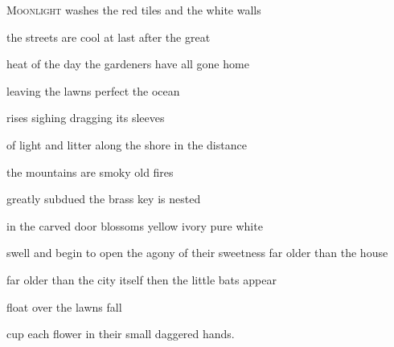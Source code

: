 
\begin{poem}
\begin{stanza}
\textsc{Moonlight} \verseline
washes the red tiles\verseline
and the white walls
\end{stanza}

\begin{stanza}
the streets\verseline
are cool at last\verseline
after the great
\end{stanza}

\begin{stanza}
heat of the day\verseline
the gardeners\verseline
have all gone home
\end{stanza}

\begin{stanza}
leaving the lawns\verseline
perfect\verseline
the ocean
\end{stanza}

\begin{stanza}
rises\verseline
sighing\verseline
dragging its sleeves
\end{stanza}

\begin{stanza}
of light and litter\verseline
along the shore\verseline
in the distance
\end{stanza}

\begin{stanza}
the mountains\verseline
are smoky\verseline
old fires
\end{stanza}

\begin{stanza}
greatly subdued\verseline
the brass key\verseline
is nested
\end{stanza}

\begin{stanza}
in the carved door\verseline
blossoms\verseline
yellow ivory pure white
\end{stanza}

\begin{stanza}
swell and begin to open\verseline
the agony of their sweetness\verseline
far older than the house
\end{stanza}

\begin{stanza}
far older than the city itself\verseline
then the little bats\verseline
appear
\end{stanza}

\begin{stanza}
float\verseline
over the lawns\verseline
fall
\end{stanza}

\begin{stanza}
cup each flower\verseline
in their small\verseline
daggered hands.
\end{stanza}
\end{poem}
